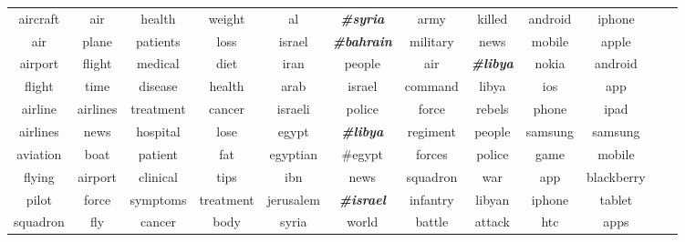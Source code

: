 \begin{frame}
\begin{table}
{\begin{tabular}{|cc|cc|cc|cc|cc|cc|}
\hline
aircraft & air & health & weight & al & \textbf{\textit{\#syria}} & army & killed & android & iphone\\ 
air & plane & patients & loss & israel & \textbf{\textit{\#bahrain}} & military & news & mobile & apple \\ 
airport & flight & medical & diet & iran & people & air & \textbf{\textit{\#libya}} & nokia & android \\ 
flight & time & disease & health & arab & israel & command & libya & ios & app \\
airline & airlines & treatment & cancer & israeli & police & force & rebels & phone & ipad \\
airlines & news & hospital & lose & egypt & \textbf{\textit{\#libya}} & regiment & people & samsung & samsung \\
aviation & boat & patient & fat & egyptian & \#egypt & forces & police & game & mobile\\
flying & airport & clinical & tips & ibn & news & squadron & war & app & blackberry \\
pilot & force & symptoms & treatment & jerusalem & \textbf{\textit{\#israel}} & infantry & libyan & iphone & tablet \\
squadron & fly & cancer & body & syria & world & battle & attack & htc & apps\\
\hline
\end{tabular}
}
\label{tbl:historyStates}
\end{table}
\end{frame}


